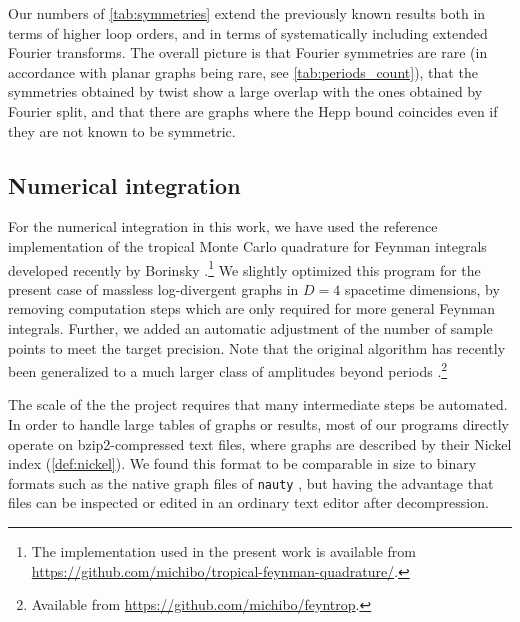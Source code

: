 \documentclass[12pt,a4paper]{article}
\renewcommand{\|}{\rule[-0.4ex]{0.2ex}{1.2em}}
\begin{document}
Our numbers of \cref{tab:symmetries} extend the previously known results both in terms of higher loop orders, and in terms of systematically  including extended Fourier transforms. The overall picture is that Fourier symmetries are rare (in accordance with planar graphs being rare, see \cref{tab:periods_count}), that the symmetries obtained by twist show a large overlap with the ones obtained by Fourier split, and that there are graphs where the Hepp bound coincides even if they are not known to be symmetric. 









\subsection{Numerical integration}\label{sec:numerical_integration}

For the  numerical integration in this work, we have used the reference implementation of the tropical Monte Carlo quadrature for Feynman integrals developed recently by Borinsky \cite{borinsky_tropical_2023a}.\footnote{The implementation used in the present work is  available from \url{https://github.com/michibo/tropical-feynman-quadrature/}.} We slightly optimized this program for the present case of massless log-divergent graphs in $D=4$ spacetime dimensions, by removing computation steps which are only required for more general Feynman integrals. Further,  we added an automatic adjustment of the number of sample points to meet the target precision. Note that the original algorithm has recently been generalized to a much larger class of amplitudes beyond periods \cite{borinsky_tropical_2023}.\footnote{Available from \url{https://github.com/michibo/feyntrop}.}

The scale of the the project requires that  many intermediate steps be automated. In order to handle large tables of graphs or results, most of our programs directly operate on bzip2-compressed text files, where graphs are described by their Nickel index (\cref{def:nickel}). We found this format to be comparable in size to binary formats such as the native graph files of \texttt{nauty} \cite{mckay_practical_2014}, but having the advantage that files can be inspected or edited in an ordinary text editor after decompression. 
\end{document}
